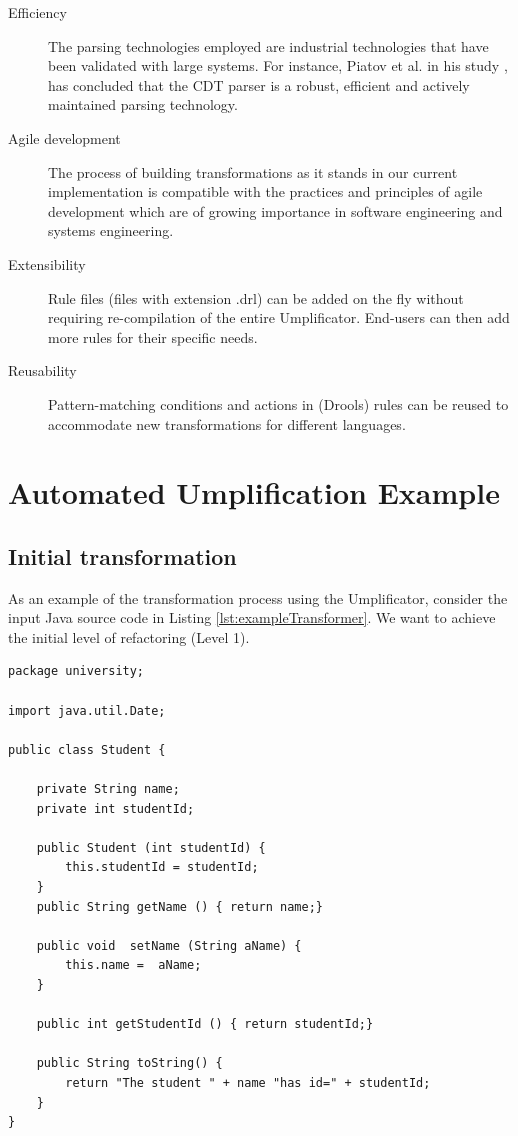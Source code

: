 \begin{description}
\item [Efficiency] The parsing technologies employed are industrial technologies that have been validated with large systems. For instance, Piatov et al. in his study \cite{CDTPARSER}, has concluded that the CDT parser is a robust, efficient and actively maintained parsing technology. 

\item [Agile development] The process of building transformations as it stands in our current implementation is compatible with the practices and principles of agile development which are of growing importance in software engineering \cite{agileDev} and systems engineering.

\item [Extensibility] Rule files (files with extension .drl) can be added on the fly without requiring re-compilation of the entire Umplificator. End-users can then add more rules for their specific needs. 

\item [Reusability] Pattern-matching conditions and actions in (Drools) rules can be reused to accommodate new transformations for different languages. 
\end{description}

\section{Automated Umplification Example}
\label{sec:automatedUmplification}
\subsection{Initial transformation}

As an example of the transformation process using the Umplificator, consider the input Java source code in Listing \ref{lst:exampleTransformer}.
We want to achieve the initial level of refactoring (Level 1).

\begin{lstlisting}[style=java, caption=Input source code, label=lst:exampleTransformer]
package university;

import java.util.Date;

public class Student {
	
    private String name;
    private int studentId;
    
    public Student (int studentId) {
    	this.studentId = studentId;
    }
    public String getName () { return name;}
    
    public void  setName (String aName) { 
    	this.name =  aName;
    }
   
    public int getStudentId () { return studentId;}
    
    public String toString() {
    	return "The student " + name "has id=" + studentId;
    }
}   
\end{lstlisting}

